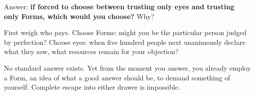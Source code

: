 Answer: \textbf{if forced to choose between trusting only eyes and trusting only Forms, which would you choose?} Why?

First weigh who pays. Choose Forms: might you be the particular person judged by perfection? Choose eyes: when five hundred people next unanimously declare what they saw, what resources remain for your objection?

No standard answer exists. Yet from the moment you answer, you already employ a Form, an idea of what a good answer should be, to demand something of yourself. Complete escape into either drawer is impossible.
